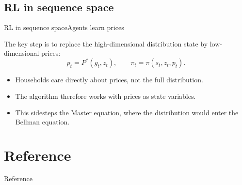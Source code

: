 \documentclass[aspectratio=169]{beamer}
\begin{document}
\subsection{RL in sequence space}

\begin{frame}{RL in sequence space}{Agents learn prices \cite{yang2025structural}}
\small

The key step is to replace the high-dimensional distribution state by low-dimensional prices:
\[
p_t = P^*(g_t,z_t),
\qquad
\pi_t = \pi(s_t,z_t,p_t).
\]

\begin{itemize}
    \item Households care directly about \alert{prices}, not the full distribution.
    \item The algorithm therefore works with \alert{prices as state variables}.
    \item This sidesteps the \alert{Master equation}, where the distribution would enter the Bellman equation.
\end{itemize}

\end{frame}




\section{Reference}

\begin{frame}[allowframebreaks]{Reference}
    \nocite{*}
    \scriptsize
    

    
\end{frame}
\end{document}
